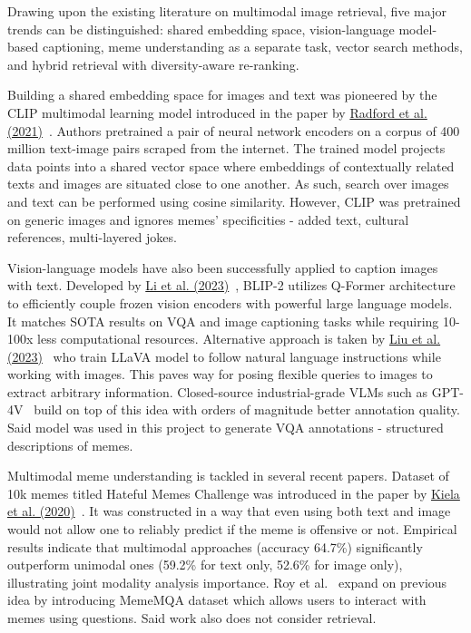 \documentclass[a4paper,12pt]{article}
\begin{document}
Drawing upon the existing literature on multimodal image retrieval, five major trends can be distinguished: shared embedding space, vision-language model-based captioning, meme understanding as a separate task, vector search methods, and hybrid retrieval with diversity-aware re-ranking.

Building a shared embedding space for images and text was pioneered by the CLIP multimodal learning model introduced in the paper by \href{https://arxiv.org/abs/2103.00020}{Radford et al. (2021)}~\cite{radford2021clip}. Authors pretrained a pair of neural network encoders on a corpus of 400 million text-image pairs scraped from the internet. The trained model projects data points into a shared vector space where embeddings of contextually related texts and images are situated close to one another. As such, search over images and text can be performed using cosine similarity. However, CLIP was pretrained on generic images and ignores memes' specificities - added text, cultural references, multi-layered jokes.

Vision-language models have also been successfully applied to caption images with text. Developed by \href{https://arxiv.org/abs/2301.12597}{Li et al. (2023)}~\cite{li2023blip2}, BLIP-2 utilizes Q-Former architecture to efficiently couple frozen vision encoders with powerful large language models. It matches SOTA results on VQA and image captioning tasks while requiring 10-100x less computational resources. Alternative approach is taken by \href{https://arxiv.org/abs/2304.08485}{Liu et al. (2023)}~\cite{liu2023llava} who train LLaVA model to follow natural language instructions while working with images. This paves way for posing flexible queries to images to extract arbitrary information. Closed-source industrial-grade VLMs such as GPT-4V~\cite{openai2023gpt4v} build on top of this idea with orders of magnitude better annotation quality. Said model was used in this project to generate VQA annotations - structured descriptions of memes.

Multimodal meme understanding is tackled in several recent papers. Dataset of 10k memes titled Hateful Memes Challenge was introduced in the paper by \href{https://arxiv.org/abs/2005.04790}{Kiela et al. (2020)}~\cite{kiela2020hateful}. It was constructed in a way that even using both text and image would not allow one to reliably predict if the meme is offensive or not. Empirical results indicate that multimodal approaches (accuracy 64.7\%) significantly outperform unimodal ones (59.2\% for text only, 52.6\% for image only), illustrating joint modality analysis importance. Roy et al.~\cite{roy2024mememqa} expand on previous idea by introducing MemeMQA dataset which allows users to interact with memes using questions. Said work also does not consider retrieval.
\end{document}
